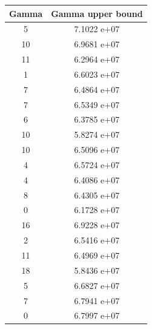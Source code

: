 \documentclass[11pt]{article}
\begin{document}
\begin{flushleft}
\begin{center}
	\begin{tabular}{||c c||} 
		\hline
		Gamma & Gamma upper bound  \\ [0.5ex] 
		\hline\hline
		5 & 7.1022 e+07 \\
		\hline
		10 & 6.9681 e+07 \\
		\hline
		11 & 6.2964 e+07 \\
		\hline
		1 & 6.6023 e+07 \\
		\hline
		7 & 6.4864 e+07 \\
		\hline
		7 & 6.5349 e+07 \\
		\hline
		6 & 6.3785 e+07 \\
		\hline
		10 & 5.8274 e+07 \\
		\hline
		10 & 6.5096 e+07 \\
		\hline
		4 & 6.5724 e+07 \\
		\hline
		4 & 6.4086 e+07 \\
		\hline
		8 & 6.4305 e+07 \\
		\hline
		0 & 6.1728 e+07 \\
		\hline
		16 & 6.9228 e+07 \\
		\hline
		2 & 6.5416 e+07 \\
		\hline
		11 & 6.4969 e+07 \\
		\hline
		18 & 5.8436 e+07 \\
		\hline
		5 & 6.6827 e+07 \\
		\hline
		7 & 6.7941 e+07 \\
		\hline
		0 & 6.7997 e+07 \\
		\hline
		
		
	\end{tabular}
\end{center}




\end{flushleft}
\end{document}
